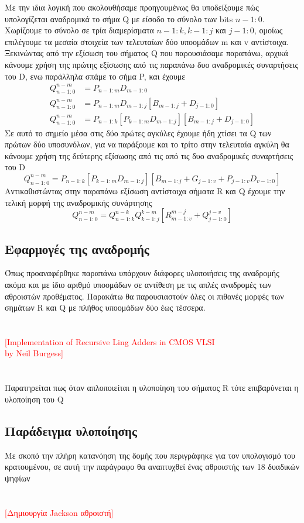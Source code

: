 Με την ιδια λογική που ακολουθήσαμε προηγουμένως θα υποδείξουμε πώς υπολογίζεται 
αναδρομικά το σήμα Q με είσοδο το σύνολο των bits $n-1:0$.
Χωρίζουμε το σύνολο σε τρία διαμερίσματα $n-1:k , k-1:j$ και $j-1:0$, ομοίως επιλέγουμε
τα μεσαία στοιχεία των τελευταίων δύο υποομάδων m και v αντίστοιχα. Ξεκινώντας από την
εξίσωση του σήματος Q που παρουσιάσαμε παραπάνω, αρχικά κάνουμε χρήση της 
πρώτης εξίσωσης από τις παραπάνω δυο αναδρομικές συναρτήσεις του D, ενω παράλληλα
σπάμε το σήμα P, και έχουμε
\begin{equation*}
\begin{split}
    Q^{n-m}_{n-1:0} &= P_{n-1:m}D_{m-1:0}\\
    Q^{n-m}_{n-1:0} &= P_{n-1:m}D_{m-1:j}[B_{m-1:j}+D_{j-1:0}] \\
    Q^{n-m}_{n-1:0} &= P_{n-1:k}[P_{k-1:m}D_{m-1:j}][B_{m-1:j}+D_{j-1:0}]
\end{split}
\end{equation*}
Σε αυτό το σημείο μέσα στις δύο πρώτες αγκύλες έχουμε ήδη χτίσει τα Q
των πρώτων δύο υποσυνόλων, για να παράξουμε και το τρίτο στην τελευταία αγκύλη
θα κάνουμε χρήση της δεύτερης εξίσωσης από τις από τις δυο αναδρομικές συναρτήσεις του D
\begin{equation*}
    Q^{n-m}_{n-1:0} = P_{n-1:k}[P_{k-1:m}D_{m-1:j}][B_{m-1:j}+G_{j-1:v}+P_{j-1:v}D_{v-1:0}]
\end{equation*}
Αντικαθιστώντας στην παραπάνω εξίσωση αντίστοιχα σήματα R και Q έχουμε την τελική 
μορφή της αναδρομικής συνάρτησης 
\begin{equation}
    Q^{n-m}_{n-1:0} = Q^{n-k}_{n-1:k}Q^{k-m}_{k-1:j}[R^{m-j}_{m-1:v}+Q^{j-v}_{j-1:0}]
\end{equation}







\subsection{Εφαρμογές της αναδρομής}
Όπως προαναφέρθηκε παραπάνω υπάρχουν διάφορες υλοποιήσεις της αναδρομής ακόμα και με 
ίδιο αριθμό υποομάδων \cite{neil_burgess} σε αντίθεση με τις απλές αναδρομές των αθροιστών προθέματος.
Παρακάτω θα παρουσιαστούν όλες οι πιθανές μορφές των σημάτων R και Q με πλήθος υποομάδων
δύο έως τέσσερα.
\\\\\\
\textcolor{red}{[Implementation of Recursive Ling Adders in CMOS VLSI \\by Neil Burgess]}
\\\\\\
Παρατηρείται πως όταν απλοποιείται η υλοποίηση του σήματος R τότε επιβαρύνεται η υλοποίηση του Q




\subsection{Παράδειγμα υλοποίησης}
Με σκοπό την πλήρη κατανόηση της δομής που περιγράφηκε για τον υπολογισμό του κρατουμένου,
σε αυτή την παράγραφο θα αναπτυχθεί ένας αθροιστής των 18 δυαδικών ψηφίων  
\\\\\\
\textcolor{red}{[Δημιουργία Jackson αθροιστή]}








